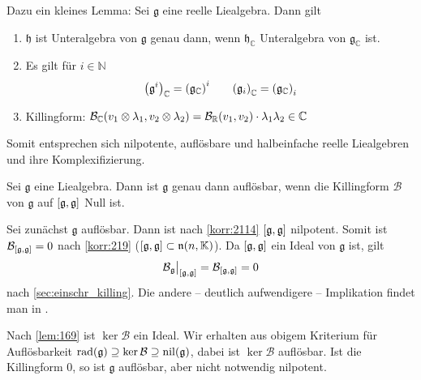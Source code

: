 Dazu ein kleines Lemma: Sei $\mathfrak{g}$ eine reelle Liealgebra.
Dann gilt
\begin{enumerate}[1)]
	\item $\mathfrak{h}$ ist Unteralgebra von $\mathfrak{g}$ genau dann, wenn $\mathfrak{h}_\mathbb{C}$ Unteralgebra von $\mathfrak{g}_\mathbb{C}$ ist.
	\item Es gilt für $i \in \mathbb{N}$
	\[
		\enbrace*{\mathfrak{g}^i}_\mathbb{C} = \enbrace*{\mathfrak{g}_\mathbb{C}}^i \qquad \enbrace*{\mathfrak{g}_i}_\mathbb{C} = \enbrace*{\mathfrak{g}_\mathbb{C}}_i
	\]
	\item Killingform: $\mathcal{B}_\mathbb{C} \enbrace*{v_1 \otimes \lambda_1, v_2 \otimes \lambda_2} = \mathcal{B}_\mathbb{R}(v_1,v_2) \cdot \lambda_1 \lambda_2 \in \mathbb{C}$
\end{enumerate}
Somit entsprechen sich nilpotente, auflösbare und halbeinfache reelle Liealgebren und ihre Komplexifizierung.

\begin{satz}[name={Cartan},label=satz:2115]
	Sei $\mathfrak{g}$ eine Liealgebra.
	Dann ist $\mathfrak{g}$ genau dann auflösbar, wenn die Killingform $\mathcal{B}$ von $\mathfrak{g}$ auf $\benbrace*{\mathfrak{g},\mathfrak{g}}$ Null ist.
\end{satz}
\begin{beweis}
	Sei zunächst $\mathfrak{g}$ auflösbar.
	Dann ist nach \autoref{korr:2114} $\benbrace*{\mathfrak{g},\mathfrak{g}}$ nilpotent.
	Somit ist $\mathcal{B}_{\benbrace{\mathfrak{g},\mathfrak{g}}}=0$ nach \autoref{korr:219} ($\benbrace*{\mathfrak{g},\mathfrak{g}} \subset \mathfrak{n}(n,\mathbb{\mathbb{K}})$).
	Da $\benbrace*{\mathfrak{g},\mathfrak{g}}$ ein Ideal von $\mathfrak{g}$ ist, gilt 
	\[
		\mathcal{B}_{\mathfrak{g}}\big|_{\benbrace*{\mathfrak{g},\mathfrak{g}}} = \mathcal{B}_{\benbrace*{\mathfrak{g},\mathfrak{g}}} =0
	\]
	nach \cref{sec:einschr_killing}.
	Die andere -- deutlich aufwendigere -- Implikation findet man in \cite[Sec.~4.6.4]{procesiLie}.
\end{beweis}

Nach \autoref{lem:169} ist $\ker \mathcal{B}$ ein Ideal.
Wir erhalten aus obigem Kriterium für Auflösbarkeit $\rad(\mathfrak{g}) \supseteq \ker \mathcal{B} \supseteq \nil(\mathfrak{g})$, dabei ist $\ker \mathcal{B}$ auflösbar.
Ist die Killingform $0$, so ist $\mathfrak{g}$ auflösbar, aber nicht notwendig nilpotent.

